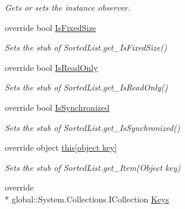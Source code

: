 \begin{DoxyCompactItemize}
\begin{DoxyCompactList}\small\item\em Gets or sets the instance observer.\end{DoxyCompactList}\item 
override bool \hyperlink{class_system_1_1_collections_1_1_fakes_1_1_stub_sorted_list_ad7574eee6ea3a38f43f1b4e82e93734f}{Is\-Fixed\-Size}
\begin{DoxyCompactList}\small\item\em Sets the stub of Sorted\-List.\-get\-\_\-\-Is\-Fixed\-Size()\end{DoxyCompactList}\item 
override bool \hyperlink{class_system_1_1_collections_1_1_fakes_1_1_stub_sorted_list_a3aa357d218e70f0f8dd9a6261c77af1f}{Is\-Read\-Only}
\begin{DoxyCompactList}\small\item\em Sets the stub of Sorted\-List.\-get\-\_\-\-Is\-Read\-Only()\end{DoxyCompactList}\item 
override bool \hyperlink{class_system_1_1_collections_1_1_fakes_1_1_stub_sorted_list_a9dab3e019bf7cae5116d432f5425c8c4}{Is\-Synchronized}
\begin{DoxyCompactList}\small\item\em Sets the stub of Sorted\-List.\-get\-\_\-\-Is\-Synchronized()\end{DoxyCompactList}\item 
override object \hyperlink{class_system_1_1_collections_1_1_fakes_1_1_stub_sorted_list_a2f08215391ef9f9d7d16133b09c4db01}{this\mbox{[}object key\mbox{]}}
\begin{DoxyCompactList}\small\item\em Sets the stub of Sorted\-List.\-get\-\_\-\-Item(\-Object key)\end{DoxyCompactList}\item 
override \\*
global\-::\-System.\-Collections.\-I\-Collection \hyperlink{class_system_1_1_collections_1_1_fakes_1_1_stub_sorted_list_ac7c95bd264750187e856cf919e6c054e}{Keys}

\end{DoxyCompactItemize}
